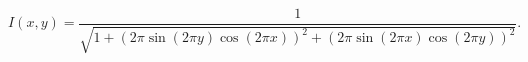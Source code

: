\begin{figure}[!htb]
    \centering
    \vspace{0.5em}

    \centering
    \[
        I(x, y) = \frac{1}{
            \sqrt{1 + \left(2\pi\sin(2\pi y)\cos(2\pi x)\right)^2 + \left(2\pi\sin(2\pi x)\cos(2\pi y)\right)^2}
        }.
    \]
\end{figure}
\vspace{10cm} %
